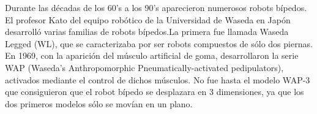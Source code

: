 Durante las décadas de los 60's a los 90's aparecieron numerosos robots bípedos. El profesor Kato del equipo robótico de la Universidad de Waseda en Japón desarrolló varias familias de robots bípedos.La primera fue llamada Waseda Legged (WL), que se caracterizaba por ser robots compuestos de sólo dos piernas.  En 1969, con la aparición del músculo artificial de goma, desarrollaron la serie WAP (Waseda's Anthropomorphic Pneumatically-activated pedipulators), activados mediante el control de dichos músculos. No fue hasta el modelo WAP-3 que consiguieron que el robot bípedo se desplazara en 3 dimensiones, ya que los dos primeros modelos sólo se movían en un plano.

\begin{figure}[H]
\centering
{}
\quad
\subfigure[WL-3]

\end{figure}
